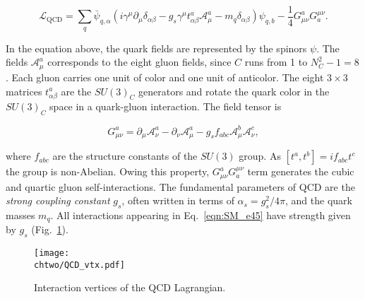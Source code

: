 \begin{equation}\label{eqn:SM_e46}
\mathcal{L}_\mathrm{QCD} = \sum_{q} \bar{\psi}_{q,\alpha} (i\gamma^\mu\partial_\mu\delta_{\alpha\beta} - g_s\gamma^\mu t^a_{\alpha\beta}\mathcal{A}^a_\mu - m_q\delta_{\alpha\beta})\psi_{q,b} - \frac{1}{4}G^a_{\mu\nu}G^{\mu\nu}_a.
\end{equation}

In the equation above, the quark fields are represented by the spinors $\psi$. The fields $\mathcal{A}^a_\mu$ corresponds to the eight gluon fields, since $C$ runs from 1 to $N^2_C - 1 = 8$.
Each gluon carries one unit of color and one unit of anticolor.
The eight $3\times3$ matrices $t^a_{\alpha\beta}$ are the $SU(3)_C$ generators and rotate the quark color in the $SU(3)_C$ space in a quark-gluon interaction.
The field tensor is

\begin{equation}\label{eqn:SM_e47}
G^a_{\mu\nu} = \partial_\mu\mathcal{A}^a_\nu - \partial_\nu\mathcal{A}^a_\mu - g_s f_{abc}\mathcal{A}^b_\mu\mathcal{A}^c_\nu,
\end{equation}

\noindent where $f_{abc}$ are the structure constants of the $SU(3)$ group.
As $[t^a,t^b] = if_{abc}t^c$ the group is non-Abelian. Owing this property, $G^a_{\mu\nu}G^{\mu\nu}_a$ term generates the cubic and quartic gluon self-interactions.
The fundamental parameters of QCD are the \textit{strong coupling constant} $g_s$, often written in terms of $\alpha_s = g_s^2/4\pi$, and the quark masses $m_q$.
All interactions appearing in Eq.~\ref{eqn:SM_e45} have strength given by $g_s$ (Fig.~\ref{fig:QCDVtx}).\\

\begin{figure}[!htb]
\centering
\texttt{[image: \\chtwo/QCD\_vtx.pdf]}
\caption{Interaction vertices of the QCD Lagrangian.}
\label{fig:QCDVtx}
\end{figure}

